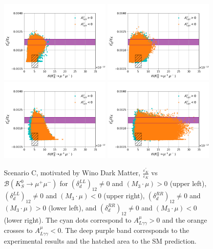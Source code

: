 \begin{figure}[h!]
\centering
\includegraphics[width=0.49\textwidth]{figs/figure_2_SCC_LL_pos.png}
\includegraphics[width=0.49\textwidth]{figs/figure_2_SCC_LL_neg.png}\\
\includegraphics[width=0.49\textwidth]{figs/figure_2_SCC_RR_pos.png}
\includegraphics[width=0.49\textwidth]{figs/figure_2_SCC_RR_neg.png}
\caption{\label{fig:eps_SCC} Scenario C, motivated by Wino Dark Matter, $\frac{\varepsilon ^\prime_K}{\varepsilon_K}$ vs $\mathcal{B}(K_S^0\rightarrow\mu^+\mu^-)$ for $\left(\delta_{d}^{LL}\right)_{12}\neq 0$ and $(M_3\cdot\mu)>0$ (upper left), $\left(\delta_{d}^{LL}\right)_{12}\neq 0$ and $(M_3\cdot\mu)<0$ (upper right), $\left(\delta_{d}^{RR}\right)_{12}\neq 0$ and $(M_3\cdot\mu)>0$ (lower left), and $\left(\delta_{d}^{RR}\right)_{12}\neq 0$ and $(M_3\cdot\mu)<0$ (lower right). The cyan dots correspond to $A^\mu_{L\gamma \gamma} > 0$ and the orange crosses to $A^\mu_{L\gamma \gamma} < 0$. The deep purple band corresponds to the experimental results and the hatched area to the SM prediction.}
\end{figure}

